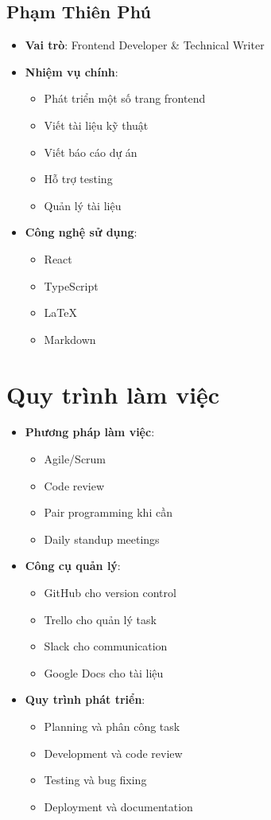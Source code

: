 \documentclass{book}
\let\oldsection\section
\renewcommand{\section}{\clearpage\oldsection}
\begin{document}
\subsection{Phạm Thiên Phú}
\begin{itemize}
    \item \textbf{Vai trò}: Frontend Developer \& Technical Writer
    \item \textbf{Nhiệm vụ chính}:
    \begin{itemize}
        \item Phát triển một số trang frontend
        \item Viết tài liệu kỹ thuật
        \item Viết báo cáo dự án
        \item Hỗ trợ testing
        \item Quản lý tài liệu
    \end{itemize}
    \item \textbf{Công nghệ sử dụng}:
    \begin{itemize}
        \item React
        \item TypeScript
        \item LaTeX
        \item Markdown
    \end{itemize}
\end{itemize}

\section{Quy trình làm việc}
\begin{itemize}
    \item \textbf{Phương pháp làm việc}:
    \begin{itemize}
        \item Agile/Scrum
        \item Code review
        \item Pair programming khi cần
        \item Daily standup meetings
    \end{itemize}
    \item \textbf{Công cụ quản lý}:
    \begin{itemize}
        \item GitHub cho version control
        \item Trello cho quản lý task
        \item Slack cho communication
        \item Google Docs cho tài liệu
    \end{itemize}
    \item \textbf{Quy trình phát triển}:
    \begin{itemize}
        \item Planning và phân công task
        \item Development và code review
        \item Testing và bug fixing
        \item Deployment và documentation
    \end{itemize}
\end{itemize}
\end{document}

